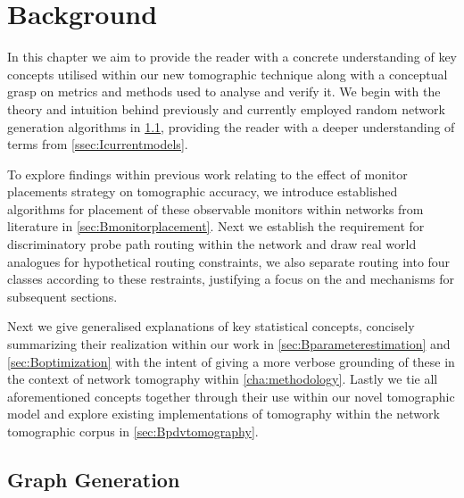 \chapter{Background}
\label{cha:background}

In this chapter we aim to provide the reader with a concrete understanding of key concepts utilised within our new tomographic technique along with a conceptual grasp on metrics and methods used to analyse and verify it. We begin with the theory and intuition behind previously and currently employed random network generation algorithms in \cref{sec:Bgraphgeneration}, providing the reader with a deeper understanding of terms from \cref{ssec:Icurrentmodels}.\par
To explore findings within previous work relating to the effect of monitor placements strategy on tomographic accuracy, we introduce established algorithms for placement of these observable monitors within networks from literature in \cref{sec:Bmonitorplacement}. Next we establish the requirement for discriminatory probe path routing within the network and draw real world analogues for hypothetical routing constraints, we also separate routing into four classes according to these restraints, justifying a focus on the \cbr and \cfr mechanisms for subsequent sections.\par
Next we give generalised explanations of key statistical concepts, concisely summarizing their realization within our work in \cref{sec:Bparameterestimation} and \cref{sec:Boptimization} with the intent of giving a more verbose grounding of these in the context of network tomography within \cref{cha:methodology}. Lastly we tie all aforementioned concepts together through their use within our novel tomographic model and explore existing implementations of \pdv tomography within the network tomographic corpus in \cref{sec:Bpdvtomography}.

\section{Graph Generation}
\label{sec:Bgraphgeneration}

